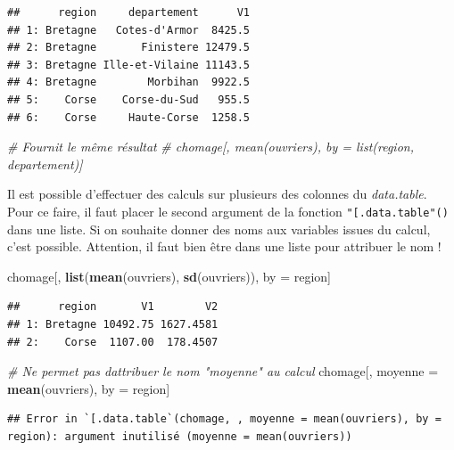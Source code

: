 \documentclass[
  11pt,
]{book}
\newenvironment{Shaded}{\begin{snugshade}}{\end{snugshade}}
\newcommand{\CommentTok}[1]{\textcolor[rgb]{0.56,0.35,0.01}{\textit{#1}}}
\newcommand{\KeywordTok}[1]{\textcolor[rgb]{0.13,0.29,0.53}{\textbf{#1}}}
\newcommand{\NormalTok}[1]{#1}
\newcommand{\StringTok}[1]{\textcolor[rgb]{0.31,0.60,0.02}{#1}}
\numberwithin{equation}{section}
\numberwithin{countremarque}{section}
\begin{document}
\begin{lstlisting}
##      region     departement      V1
## 1: Bretagne   Cotes-d'Armor  8425.5
## 2: Bretagne       Finistere 12479.5
## 3: Bretagne Ille-et-Vilaine 11143.5
## 4: Bretagne        Morbihan  9922.5
## 5:    Corse    Corse-du-Sud   955.5
## 6:    Corse     Haute-Corse  1258.5
\end{lstlisting}

\begin{Shaded}
\begin{Highlighting}[]
\CommentTok{\# Fournit le même résultat}
\CommentTok{\# chomage[, mean(ouvriers), by = list(region, departement)]}
\end{Highlighting}
\end{Shaded}

Il est possible d'effectuer des calculs sur plusieurs des colonnes du \emph{data.table}. Pour ce faire, il faut placer le second argument de la fonction \texttt{"{[}.data.table"()} dans une liste. Si on souhaite donner des noms aux variables issues du calcul, c'est possible. Attention, il faut bien être dans une liste pour attribuer le nom !

\begin{Shaded}
\begin{Highlighting}[]
\NormalTok{chomage[, }\KeywordTok{list}\NormalTok{(}\KeywordTok{mean}\NormalTok{(ouvriers), }\KeywordTok{sd}\NormalTok{(ouvriers)), by =}\StringTok{ }\NormalTok{region]}
\end{Highlighting}
\end{Shaded}

\begin{lstlisting}
##      region       V1        V2
## 1: Bretagne 10492.75 1627.4581
## 2:    Corse  1107.00  178.4507
\end{lstlisting}

\begin{Shaded}
\begin{Highlighting}[]
\CommentTok{\# Ne permet pas d\textquotesingle{}attribuer le nom "moyenne" au calcul}
\NormalTok{chomage[, moyenne =}\StringTok{ }\KeywordTok{mean}\NormalTok{(ouvriers), by =}\StringTok{ }\NormalTok{region]}
\end{Highlighting}
\end{Shaded}

\begin{lstlisting}
## Error in `[.data.table`(chomage, , moyenne = mean(ouvriers), by = region): argument inutilisé (moyenne = mean(ouvriers))
\end{lstlisting}
\end{document}
